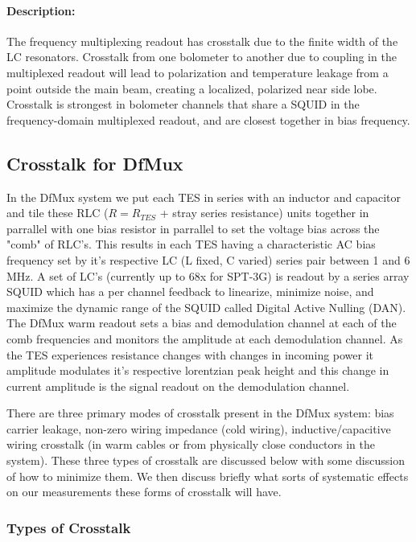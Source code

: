 \paragraph{Description:}
The frequency multiplexing readout has crosstalk due to the finite width of the LC resonators.
Crosstalk from one bolometer to another due to coupling in the multiplexed readout will lead to polarization and temperature leakage from a point outside the main beam, creating a localized, polarized near side lobe. Crosstalk is strongest in bolometer channels that share a SQUID in the frequency-domain multiplexed readout, and are closest together in bias frequency.

\subsection{Crosstalk for DfMux}
In the DfMux system we put each TES in series with an inductor and capacitor and tile these RLC ($R=R_{TES}$ + stray series resistance) units together in parrallel with one bias resistor in parrallel to set the voltage bias across the "comb" of RLC's. This results in each TES having a characteristic AC bias frequency set by it's respective LC (L fixed, C varied) series pair between 1 and 6 MHz. A set of LC's (currently up to 68x for SPT-3G) is readout by a series array SQUID which has a per channel feedback to linearize, minimize noise, and maximize the dynamic range of the SQUID called Digital Active Nulling (DAN). The DfMux warm readout sets a bias and demodulation channel at each of the comb frequencies and monitors the amplitude at each demodulation channel. As the TES experiences resistance changes with changes in incoming power it amplitude modulates it's respective lorentzian peak height and this change in current amplitude is the signal readout on the demodulation channel. 

There are three primary modes of crosstalk present in the DfMux system: bias carrier leakage, non-zero wiring impedance (cold wiring), inductive/capacitive wiring crosstalk (in warm cables or from physically close conductors in the system). These three types of crosstalk are discussed below with some discussion of how to minimize them. We then discuss briefly what sorts of systematic effects on our measurements these forms of crosstalk will have.

\subsubsection{Types of Crosstalk}
\setcounter{equation}{0}
